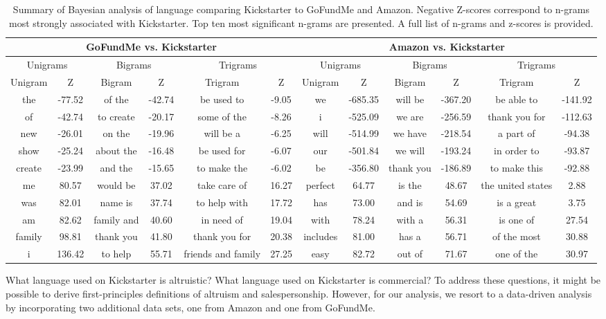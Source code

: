 \documentclass[letterpaper]{article}
\begin{document}
\begin{table}[t]
\centering
\scriptsize
\begin{tabular}{|*{12}{c|}}
\hline
\multicolumn{6}{|c}{GoFundMe vs. Kickstarter} & \multicolumn{6}{|c|}{Amazon vs. Kickstarter} \\ \hline
\multicolumn{2}{|c}{Unigrams} & \multicolumn{2}{|c}{Bigrams} & \multicolumn{2}{|c}{Trigrams} & 
\multicolumn{2}{|c}{Unigrams} & \multicolumn{2}{|c}{Bigrams} & \multicolumn{2}{|c|}{Trigrams} \\ \hline 
Unigram & Z & Bigram & Z & Trigram & Z & Unigram & Z & Bigram & Z & Trigram & Z \\ \hline
the & -77.52 & of the & -42.74 & be used to & -9.05 &
we & -685.35 & will be & -367.20 & be able to & -141.92 \\\hline
of & -42.74 & to create & -20.17 & some of the & -8.26 &
i & -525.09 & we are & -256.59 & thank you for & -112.63 \\\hline
new & -26.01 & on the & -19.96 & will be a & -6.25 &
will & -514.99 & we have & -218.54 & a part of & -94.38 \\\hline
show & -25.24 & about the & -16.48 & be used for & -6.07 &
our & -501.84 & we will & -193.24 & in order to & -93.87 \\\hline
create & -23.99 & and the & -15.65 & to make the & -6.02 &
be & -356.80 & thank you & -186.89 & to make this & -92.88 \\\hline \hline

me & 80.57 & would be & 37.02 & take care of & 16.27 &
perfect & 64.77 & is the & 48.67 & the united states & 2.88 \\\hline
was & 82.01 & name is & 37.74 & to help with & 17.72 &
has & 73.00 & and is & 54.69 & is a great & 3.75\\\hline
am & 82.62 & family and & 40.60 & in need of & 19.04 &
with & 78.24 & with a & 56.31 & is one of & 27.54\\\hline
family & 98.81 & thank you & 41.80 & thank you for & 20.38 &
includes & 81.00 & has a & 56.71 & of the most & 30.88\\\hline
i & 136.42 & to help & 55.71 & friends and family & 27.25 &
easy & 82.72 & out of & 71.67 & one of the & 30.97 \\\hline
\end{tabular}
\caption{Summary of Bayesian analysis of language comparing Kickstarter to GoFundMe and Amazon. Negative Z-scores correspond to n-grams most strongly associated with Kickstarter. Top ten most significant n-grams are presented. A full list of n-grams and z-scores is provided.\footnotemark}
\label{tab:pairwise}
\end{table}
What language used on Kickstarter is altruistic? What language used on Kickstarter is commercial? To address these questions, it might be possible to derive first-principles definitions of altruism and salespersonship. However, for our analysis, we resort to a data-driven analysis by incorporating two additional data sets, one from Amazon and one from GoFundMe.
\end{document}
